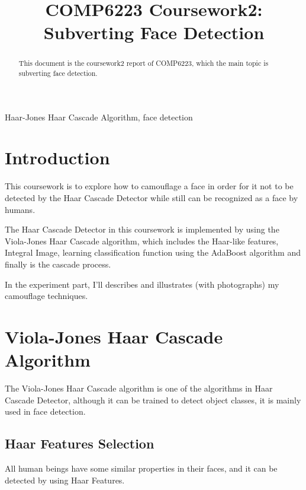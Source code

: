 \documentclass[conference]{IEEEtran}
\begin{document}
\title{COMP6223 Coursework2: Subverting Face Detection}

\author{
}

\maketitle

\begin{abstract}
This document is the coursework2 report of COMP6223, which the main topic is subverting face detection.
\end{abstract}

\begin{IEEEkeywords}
Haar-Jones Haar Cascade Algorithm, face detection
\end{IEEEkeywords}

\section{Introduction}
This coursework is to explore how to camouflage a face in order for it not to be detected by the Haar Cascade Detector while still can be recognized as a face by humans.

The Haar Cascade Detector in this coursework is implemented by using the Viola-Jones Haar Cascade algorithm, which includes the Haar-like features, Integral Image, learning classification function using the AdaBoost algorithm and finally is the cascade process.

In the experiment part, I'll describes and illustrates (with photographs) my camouflage techniques.

\section{Viola-Jones Haar Cascade Algorithm}
The Viola-Jones Haar Cascade algorithm is one of the algorithms in Haar Cascade Detector, although it can be trained to detect object classes, it is mainly used in face detection.

\subsection{Haar Features Selection}
All human beings have some similar properties in their faces, and it can be detected by using Haar Features.
\end{document}
